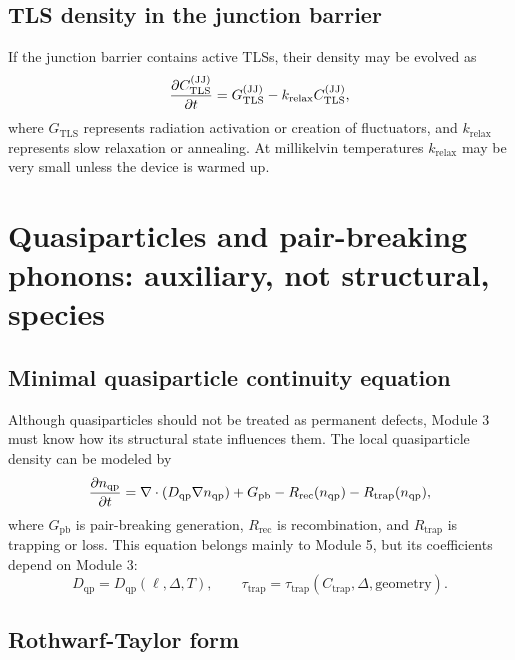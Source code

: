 \documentclass[11pt]{article}
\begin{document}
\subsection{TLS density in the junction barrier}

If the junction barrier contains active TLSs, their density may be evolved as
\begin{equation}
\pdv{C_{\mathrm{TLS}}^{(\mathrm{JJ})}}{t}
=G_{\mathrm{TLS}}^{(\mathrm{JJ})}-k_{\mathrm{relax}} C_{\mathrm{TLS}}^{(\mathrm{JJ})},
\label{eq:jj_tls_evolution}
\end{equation}
where $G_{\mathrm{TLS}}$ represents radiation activation or creation of fluctuators, and $k_{\mathrm{relax}}$ represents slow relaxation or annealing. At millikelvin temperatures $k_{\mathrm{relax}}$ may be very small unless the device is warmed up.

\section{Quasiparticles and pair-breaking phonons: auxiliary, not structural, species}

\subsection{Minimal quasiparticle continuity equation}

Although quasiparticles should not be treated as permanent defects, Module 3 must know how its structural state influences them. The local quasiparticle density can be modeled by
\begin{equation}
\pdv{n_{\mathrm{qp}}}{t}
=\nabla\cdot\left(D_{\mathrm{qp}}\nabla n_{\mathrm{qp}}\right)
+G_{\mathrm{pb}}
-R_{\mathrm{rec}}(n_{\mathrm{qp}})
-R_{\mathrm{trap}}(n_{\mathrm{qp}}),
\label{eq:qp_diffusion_reaction}
\end{equation}
where $G_{\mathrm{pb}}$ is pair-breaking generation, $R_{\mathrm{rec}}$ is recombination, and $R_{\mathrm{trap}}$ is trapping or loss. This equation belongs mainly to Module 5, but its coefficients depend on Module 3:
\begin{equation}
D_{\mathrm{qp}}=D_{\mathrm{qp}}(\ell,\Delta,T),
\qquad
\tau_{\mathrm{trap}}=\tau_{\mathrm{trap}}(C_{\mathrm{trap}},\Delta,\mathrm{geometry}).
\label{eq:qp_coeffs_from_m3}
\end{equation}

\subsection{Rothwarf-Taylor form}
\end{document}
